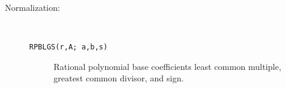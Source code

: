 \begin{description}
\item[Normalization:] \ \
  \begin{description}
  \item[{\tt  RPBLGS(r,A; a,b,s) 
}]  Rational polynomial base coefficients least common multiple,
    greatest common divisor, and sign.
  \end{description}

\end{description}

